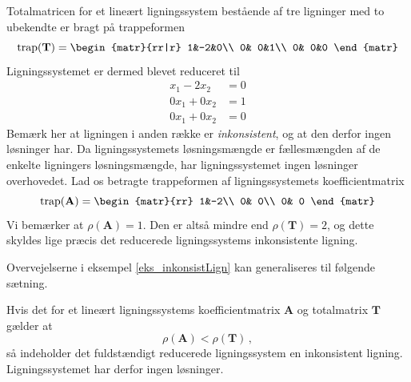 \begin{example}\label{eks_inkonsistLign}
Totalmatricen for et lineært ligningssystem bestående af tre ligninger med to ubekendte er bragt på trappeformen
\begin{equation}\mathrm{trap}(\mathbf T)=
\begin{matr}{rr|r}
 1&-2&0\\
 0& 0&1\\
 0& 0&0
\end{matr}
\end{equation}
Ligningssystemet er dermed blevet reduceret til
\begin{equation}
\begin{aligned}
x_1-2x_2&=0\\
0x_1+0x_2&=1\\
0x_1+0x_2&=0
\end{aligned}
\end{equation}
Bemærk her at ligningen i anden række er \textit{inkonsistent}, og at den derfor ingen løsninger har. Da ligningssystemets løsningsmængde er fællesmængden af de enkelte ligningers løsningsmængde, har ligningssystemet ingen løsninger overhovedet.\bs
Lad os betragte trappeformen af ligningssystemets koefficientmatrix
\begin{equation}
\mathrm{trap}(\mathbf A)=
\begin{matr}{rr}
 1&-2\\
 0& 0\\
 0& 0
\end{matr}
\end{equation}
Vi bemærker at $\rho(\mathbf A)=1$. Den er altså mindre end $\rho(\mathbf T)=2$, og dette skyldes lige præcis det reducerede ligningssystems inkonsistente ligning.
\end{example}

Overvejelserne i eksempel \ref{eks_inkonsistLign} kan generaliseres til følgende sætning.

\begin{theorem}\label{TN2.11c0}
Hvis det for et lineært ligningssystems koefficientmatrix $\mathbf A$ og totalmatrix $\mathbf T$ gælder at
\begin{equation}
\rho(\mathbf A)< \rho(\mathbf T)\,,
\end{equation}
så indeholder det fuldstændigt reducerede ligningssystem en inkonsistent ligning. Ligningssystemet har derfor ingen løsninger.
\end{theorem}

